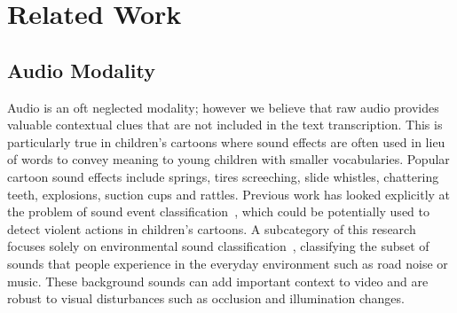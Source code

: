\documentclass[letterpaper]{article}
\begin{document}
\section{Related Work}\label{RW}


\subsection{Audio Modality}
Audio is an oft neglected modality; however we believe that raw audio provides valuable contextual clues that are not included in the text transcription.  This is particularly true in children’s cartoons where sound effects are often used in lieu of words to convey meaning to young children with smaller vocabularies.  Popular cartoon sound effects include springs, tires screeching, slide whistles, chattering teeth, explosions, suction cups and rattles.   Previous work has looked explicitly at the problem of sound event classification~\cite{soundevent}, which could be potentially used to detect violent actions in children's cartoons.  A subcategory of this research focuses solely on environmental sound classification~\cite{esc1,esc2}, classifying the subset of sounds that people experience in the everyday environment such as road noise or music.   These background sounds can add important context to video and are robust to visual disturbances such as occlusion and illumination changes.
\end{document}

